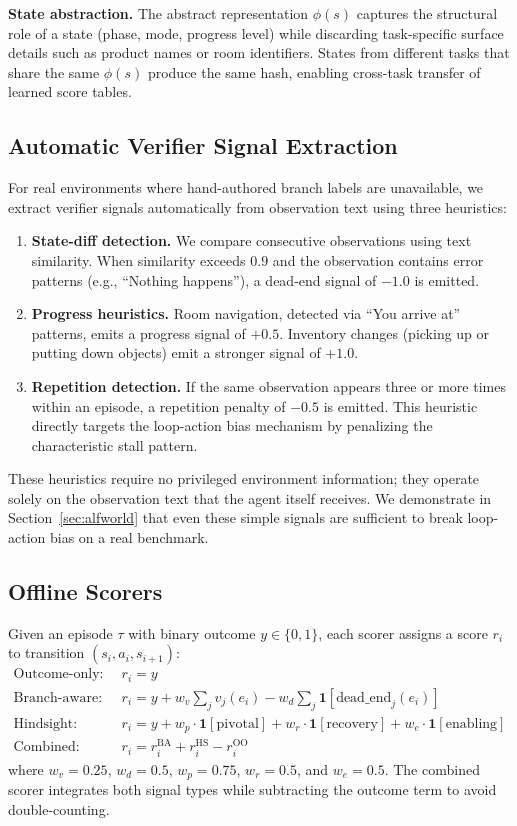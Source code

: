\documentclass[11pt]{article}
\begin{document}
\textbf{State abstraction.} The abstract representation $\phi(s)$ captures the structural role of a state (phase, mode, progress level) while discarding task-specific surface details such as product names or room identifiers. States from different tasks that share the same $\phi(s)$ produce the same hash, enabling cross-task transfer of learned score tables.

\subsection{Automatic Verifier Signal Extraction}

For real environments where hand-authored branch labels are unavailable, we extract verifier signals automatically from observation text using three heuristics:
\begin{enumerate}[nosep]
  \item \textbf{State-diff detection.} We compare consecutive observations using text similarity. When similarity exceeds $0.9$ and the observation contains error patterns (e.g., ``Nothing happens''), a dead-end signal of $-1.0$ is emitted.
  \item \textbf{Progress heuristics.} Room navigation, detected via ``You arrive at'' patterns, emits a progress signal of $+0.5$. Inventory changes (picking up or putting down objects) emit a stronger signal of $+1.0$.
  \item \textbf{Repetition detection.} If the same observation appears three or more times within an episode, a repetition penalty of $-0.5$ is emitted. This heuristic directly targets the loop-action bias mechanism by penalizing the characteristic stall pattern.
\end{enumerate}
These heuristics require no privileged environment information; they operate solely on the observation text that the agent itself receives. We demonstrate in Section~\ref{sec:alfworld} that even these simple signals are sufficient to break loop-action bias on a real benchmark.

\subsection{Offline Scorers}

Given an episode $\tau$ with binary outcome $y \in \{0,1\}$, each scorer assigns a score $r_i$ to transition $(s_i, a_i, s_{i+1})$:
\begin{align}
  \text{Outcome-only:}\quad & r_i = y \\
  \text{Branch-aware:}\quad & r_i = y + w_v \textstyle\sum_j v_j(e_i) - w_d \textstyle\sum_j \mathbf{1}[\text{dead\_end}_j(e_i)] \\
  \text{Hindsight:}\quad & r_i = y + w_p \cdot \mathbf{1}[\text{pivotal}] + w_r \cdot \mathbf{1}[\text{recovery}] + w_e \cdot \mathbf{1}[\text{enabling}] \\
  \text{Combined:}\quad & r_i = r_i^{\text{BA}} + r_i^{\text{HS}} - r_i^{\text{OO}}
\end{align}
where $w_v{=}0.25$, $w_d{=}0.5$, $w_p{=}0.75$, $w_r{=}0.5$, and $w_e{=}0.5$. The combined scorer integrates both signal types while subtracting the outcome term to avoid double-counting.
\end{document}
